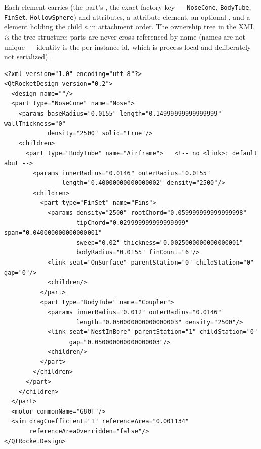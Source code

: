Each  element carries  (the part's , the exact
factory key --- \texttt{NoseCone}, \texttt{BodyTube}, \texttt{FinSet},
\texttt{HollowSphere}) and  attributes, a  attribute element, an
optional , and a  element holding the child s
in attachment order. The ownership tree in the XML \emph{is} the tree structure; parts are
never cross-referenced by name (names are not unique --- identity is the per-instance id,
which is process-local and deliberately not serialized).

\begin{listing}[htbp]
\begin{verbatim}
<?xml version="1.0" encoding="utf-8"?>
<QtRocketDesign version="0.2">
  <design name=""/>
  <part type="NoseCone" name="Nose">
    <params baseRadius="0.0155" length="0.14999999999999999" wallThickness="0"
            density="2500" solid="true"/>
    <children>
      <part type="BodyTube" name="Airframe">   <!-- no <link>: default abut -->
        <params innerRadius="0.0146" outerRadius="0.0155"
                length="0.40000000000000002" density="2500"/>
        <children>
          <part type="FinSet" name="Fins">
            <params density="2500" rootChord="0.059999999999999998"
                    tipChord="0.029999999999999999" span="0.040000000000000001"
                    sweep="0.02" thickness="0.0025000000000000001"
                    bodyRadius="0.0155" finCount="6"/>
            <link seat="OnSurface" parentStation="0" childStation="0" gap="0"/>
            <children/>
          </part>
          <part type="BodyTube" name="Coupler">
            <params innerRadius="0.012" outerRadius="0.0146"
                    length="0.050000000000000003" density="2500"/>
            <link seat="NestInBore" parentStation="1" childStation="0"
                  gap="0.050000000000000003"/>
            <children/>
          </part>
        </children>
      </part>
    </children>
  </part>
  <motor commonName="G80T"/>
  <sim dragCoefficient="1" referenceArea="0.001134"
       referenceAreaOverridden="false"/>
</QtRocketDesign>
\end{verbatim}
\caption{A complete \texttt{.qrd} file (;
attribute lists re-wrapped to the page and the default-abut annotation added, content
otherwise verbatim). All three seat kinds
appear: the airframe abuts the nose by the elided default, the fins seat
, the coupler nests . The motor is a database
reference, not an inlined thrust curve.}
\label{lst:serialization-qrd}
\end{listing}

